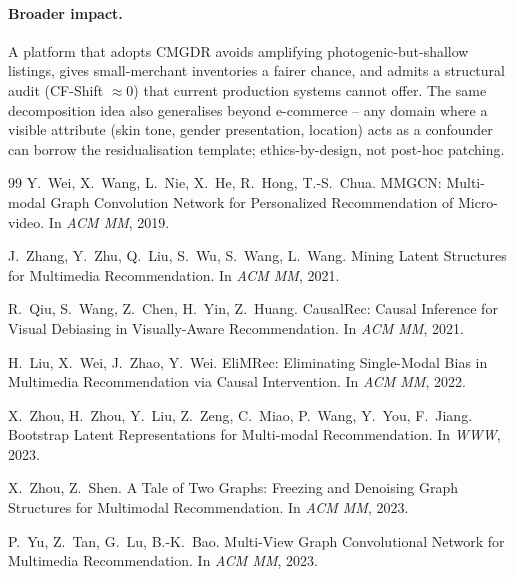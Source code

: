 \documentclass[12pt,a4paper]{article}
\begin{document}
\paragraph{Broader impact.}
A platform that adopts CMGDR avoids amplifying photogenic-but-shallow listings, gives
small-merchant inventories a fairer chance, and admits a structural audit
(CF-Shift $\approx 0$) that current production systems cannot offer. The same
decomposition idea also generalises beyond e-commerce -- any domain where a visible
attribute (skin tone, gender presentation, location) acts as a confounder can borrow
the residualisation template; ethics-by-design, not post-hoc patching.


\begin{thebibliography}{99}
Y.~Wei, X.~Wang, L.~Nie, X.~He, R.~Hong, T.-S.~Chua.
\newblock MMGCN: Multi-modal Graph Convolution Network for Personalized Recommendation
of Micro-video.
\newblock In \emph{ACM MM}, 2019.

J.~Zhang, Y.~Zhu, Q.~Liu, S.~Wu, S.~Wang, L.~Wang.
\newblock Mining Latent Structures for Multimedia Recommendation.
\newblock In \emph{ACM MM}, 2021.

R.~Qiu, S.~Wang, Z.~Chen, H.~Yin, Z.~Huang.
\newblock CausalRec: Causal Inference for Visual Debiasing in Visually-Aware
Recommendation.
\newblock In \emph{ACM MM}, 2021.

H.~Liu, X.~Wei, J.~Zhao, Y.~Wei.
\newblock EliMRec: Eliminating Single-Modal Bias in Multimedia Recommendation via
Causal Intervention.
\newblock In \emph{ACM MM}, 2022.

X.~Zhou, H.~Zhou, Y.~Liu, Z.~Zeng, C.~Miao, P.~Wang, Y.~You, F.~Jiang.
\newblock Bootstrap Latent Representations for Multi-modal Recommendation.
\newblock In \emph{WWW}, 2023.

X.~Zhou, Z.~Shen.
\newblock A Tale of Two Graphs: Freezing and Denoising Graph Structures for Multimodal
Recommendation.
\newblock In \emph{ACM MM}, 2023.

P.~Yu, Z.~Tan, G.~Lu, B.-K.~Bao.
\newblock Multi-View Graph Convolutional Network for Multimedia Recommendation.
\newblock In \emph{ACM MM}, 2023.


\end{thebibliography}
\end{document}

